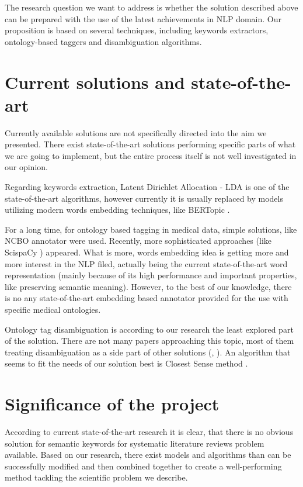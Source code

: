 \documentclass[11pt]{article}
\begin{document}
The research question we want to address is whether the solution described above can be prepared with the use of the latest achievements in NLP domain. Our proposition is based on several techniques, including keywords extractors, ontology-based taggers and disambiguation algorithms. 

\section{Current solutions and state-of-the-art}

Currently available solutions are not specifically directed into the aim we presented. There exist state-of-the-art solutions performing specific parts of what we are going to implement, but the entire process itself is not well investigated in our opinion. 

Regarding keywords extraction, Latent Dirichlet Allocation - LDA  \cite{LDA} is one of the state-of-the-art algorithms, however currently it is usually replaced by models utilizing modern words embedding techniques, like BERTopic \cite{BERTopic}. 

For a long time, for ontology based tagging in medical data, simple solutions, like NCBO  annotator \cite{NCBO} were used. Recently, more sophisticated approaches (like ScispaCy \cite{scispacy}) appeared. What is more, words embedding idea is getting more and more interest in the NLP filed, actually being the current state-of-the-art word representation (mainly because of its high performance and important properties, like preserving semantic meaning). However, to the best of our knowledge, there is no any state-of-the-art embedding based annotator provided for the use with specific medical ontologies. 

Ontology tag disambiguation is according to our research the least explored part of the solution. There are not many papers approaching this topic, most of them treating disambiguation as a side part of other solutions (\cite{taggerOne}, \cite{dis_side}). An algorithm that seems to fit the needs of our solution best is Closest Sense method
\cite{ClosestSense}.


\section{Significance of the project}

According to current state-of-the-art research it is clear, that there is no obvious solution for semantic keywords for systematic literature reviews problem available. Based on our research, there exist models and algorithms than can be successfully modified and then combined together to create a well-performing method tackling the scientific problem we describe. 
\end{document}
